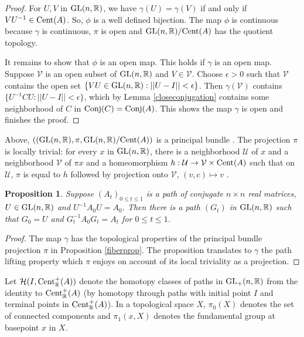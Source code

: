 \documentclass{amsart}
\newtheorem{prop}[theorem]{Proposition}
\theoremstyle{definition}
\theoremstyle{remark}
\numberwithin{equation}{section}
\begin{document}
{{\begin{proof} 
For $U,V$ in 
$\textnormal{GL}(n,\mathbb R)$, we have 
$\gamma(U)=\gamma(V)$ if and only if $VU^{-1}\in 
\textnormal{Cent}(A)$. So, $\phi$ is a well defined bijection. 
The map $\phi$ is continuous because $\gamma$ is continuous, 
$\pi$ is open and 
$\textnormal{GL}(n,\mathbb R)/\textnormal{Cent}(A)$ has the 
quotient topology. 

It remains to show that $\phi$ is an open map. This holds if 
$\gamma$ is an open map. Suppose $\mathcal V$ is 
an open 
subset of 
$ \textnormal{GL}(n,\mathbb R)$
and  $V \in \mathcal V$. Choose $\epsilon >0$ such that 
$ \mathcal V$ contains the open set 
$\{VU \in \textnormal{GL}(n,\mathbb R): ||U-I||< \epsilon \}$. 
Then $\gamma (\mathcal V)$ contains 
$\{ U^{-1}CU: ||U-I||< \epsilon \} $, which by   
Lemma \ref{closeconjugation} contains 
some neighborhood of 
$C$ in $\textnormal{Conj}(C)
=\textnormal{Conj}(A) $.   
  This shows the map $\gamma$ 
is open and finishes the proof. 
\end{proof} 

Above, 
$((\textnormal{GL}(n,\mathbb R), \pi ,  
\textnormal{GL}(n,\mathbb R)/\textnormal{Cent}(A)) $ 
is a principal bundle
\cite[Ch. 4.2]{Hus}. 
 The projection $\pi $ is locally trivial: 
for every $x$ in 
$\textnormal{GL}(n,\mathbb R)$, there is a neighborhood  $\mathcal U$ of $x$ 
and a neighborhood $\mathcal V$ of $\pi x$ and a homeomorphism $h: 
\mathcal U \to \mathcal V \times \textnormal{Cent}(A) $ such that 
on  $\mathcal U$, $\pi $ is equal to $h$ followed by 
 projection onto $\mathcal V$, $(v,c)\mapsto v$ .

\begin{prop} \label{pathlift} 
Suppose $(A_t)_{0\leq t\leq 1}$ is a path 
of conjugate $n\times n$ real matrices, $U\in 
\textnormal{GL}(n,\mathbb R)$ and $U^{-1}A_0U=A_0$. Then there 
is a path $(G_t)$ in $\textnormal{GL}(n,\mathbb R)$ such that 
$G_0=U$ and $G_t^{-1}A_0G_t=A_t$ for $0\leq t \leq 1$. 
\end{prop} 
\begin{proof} 
The map $\gamma $ has the topological properties of 
the principal bundle projection $\pi$ in  
Proposition \ref{fiberprop}.
The proposition translates to $\gamma$ the path lifting property 
which  $\pi$ enjoys on account of its local triviality as 
a projection. 
\end{proof} 

Let $\mathcal H(I, {\textnormal{Cent}^+_{\mathbb R}(A)})$ denote the homotopy classes 
of paths in $\textnormal{GL}_+(n,\mathbb R)$ from 
the identity to ${\textnormal{Cent}^+_{\mathbb R}(A)}$ (by homotopy through paths with initial 
point $I$ and terminal points in ${\textnormal{Cent}^+_{\mathbb R}(A)}$).  
In a topological space $X$, $\pi_0(X)$ denotes the set of 
connected components and $\pi_1(x,X)$ denotes the fundamental group 
at basepoint $x$ in $X$. 

}}
\end{document}
